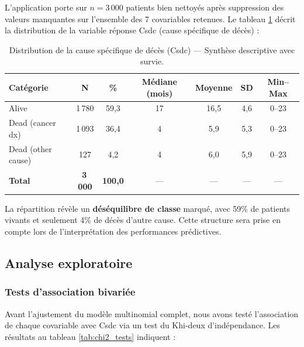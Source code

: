 \documentclass[12pt,a4paper]{article}
\begin{document}
L'application porte sur $n = 3\,000$ patients bien nettoyés après suppression des valeurs manquantes sur l'ensemble des 7 covariables retenues. Le tableau \ref{tab:descriptif_outcome} décrit la distribution de la variable réponse Csdc (cause spécifique de décès) :

\begin{table}[H]
\centering
\caption{Distribution de la cause spécifique de décès (Csdc) ---  Synthèse descriptive avec survie.}
\label{tab:descriptif_outcome}
\begin{tabular}{@{}lcccccc@{}}
\toprule
\textbf{Catégorie} & \textbf{N} & \textbf{\%} & \textbf{Médiane (mois)} & \textbf{Moyenne} & \textbf{SD} & \textbf{Min–Max} \\
\midrule
Alive & 1\,780 & 59{,}3 & 17 & 16{,}5 & 4{,}6 & 0–23 \\
Dead (cancer dx) & 1\,093 & 36{,}4 & 4 & 5{,}9 & 5{,}3 & 0–23 \\
Dead (other cause) & 127 & 4{,}2 & 4 & 6{,}0 & 5{,}9 & 0–23 \\
\bottomrule
\textbf{Total} & \textbf{3\,000} & \textbf{100{,}0} & — & — & — & — \\
\bottomrule
\end{tabular}
\end{table}

La répartition révèle un \textbf{déséquilibre de classe} marqué, avec 59\% de patients vivants et seulement 4\% de décès d'autre cause. Cette structure sera prise en compte lors de l'interprétation des performances prédictives.

\subsection{Analyse exploratoire}

\subsubsection{Tests d'association bivariée}

Avant l'ajustement du modèle multinomial complet, nous avons testé l'association de chaque covariable avec Csdc via un test du Khi-deux d'indépendance. Les résultats au tableau \ref{tab:chi2_tests} indiquent :
\end{document}
